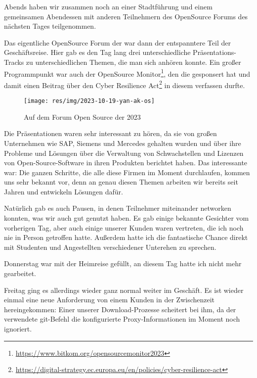Abends haben wir zusammen noch an einer Stadtführung und einem gemeinsamen Abendessen mit anderen Teilnehmern des OpenSource Forums des nächsten Tages teilgenommen.

Das eigentliche OpenSource Forum der {\bitkom} war dann der entspanntere Teil der Geschäftsreise.
Hier gab es den Tag lang drei unterschiedliche Präsentations-Tracks zu unterschiedlichen Themen, die man sich anhören konnte.
Ein großer Programmpunkt war auch der {\bitkom} OpenSource Monitor\footnote{\url{https://www.bitkom.org/opensourcemonitor2023}}, den die {\metaeffekt} gesponsert hat und damit einen Beitrag über den Cyber Resilience Act\footnote{\url{https://digital-strategy.ec.europa.eu/en/policies/cyber-resilience-act}} in diesem verfassen durfte.

\begin{figure}[htbp] %
    \centering
    \texttt{[image: res/img/2023-10-19-yan-ak-os]}
    \caption{Auf dem Forum Open Source der {\bitkom} 2023}
    \label{fig:yan-foss23}
\end{figure}

Die Präsentationen waren sehr interessant zu hören, da sie von großen Unternehmen wie SAP, Siemens und Mercedes gehalten wurden und über ihre Probleme und Lösungen über die Verwaltung von Schwachstellen und Lizenzen von Open-Source-Software in ihren Produkten berichtet haben.
Das interessante war: Die ganzen Schritte, die alle diese Firmen im Moment durchlaufen, kommen uns sehr bekannt vor, denn an genau diesen Themen arbeiten wir bereits seit Jahren und entwickeln Lösungen dafür.

Natürlich gab es auch Pausen, in denen Teilnehmer miteinander networken konnten, was wir auch gut genutzt haben.
Es gab einige bekannte Gesichter vom vorherigen Tag, aber auch einige unserer Kunden waren vertreten, die ich noch nie in Person getroffen hatte.
Außerdem hatte ich die fantastische Chance direkt mit Studenten und Angestellten verschiedener Unterehen zu sprechen.

Donnerstag war mit der Heimreise gefüllt, an diesem Tag hatte ich nicht mehr gearbeitet.

Freitag ging es allerdings wieder ganz normal weiter im Geschäft.
Es ist wieder einmal eine neue Anforderung von einem Kunden in der Zwischenzeit hereingekommen:
Einer unserer Download-Prozesse scheitert bei ihm, da der verwendete git-Befehl die konfigurierte Proxy-Informationen im Moment noch ignoriert.

